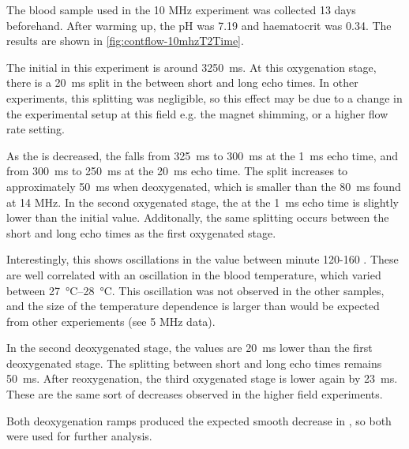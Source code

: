 The blood sample used in the 10 MHz experiment was collected 13 days beforehand.
After warming up, the pH was 7.19 and haematocrit was 0.34.
The results are shown in \autoref{fig:contflow-10mhzT2Time}.

The initial \Ttwo in this experiment is around \SI{3250}{ms}.
At this oxygenation stage, there is a \SI{20}{ms} split in the \Ttwo between short and long echo times.
In other experiments, this splitting was negligible, so this effect may be due to a change in the experimental setup at this field e.g. the magnet shimming, or a higher flow rate setting.

As the \SOtwo is decreased, the \Ttwo falls from \SI{325}{ms} to \SI{300}{ms} at the \SI{1}{ms} echo time, and from \SI{300}{ms} to \SI{250}{ms} at the \SI{20}{ms} echo time.
The split increases to approximately \SI{50}{ms} when deoxygenated, which is smaller than the \SI{80}{ms} found at 14 MHz.
In the second oxygenated stage, the \Ttwo at the \SI{1}{ms} echo time is slightly lower than the initial value.
Additonally, the same splitting occurs between the short and long echo times as the first oxygenated stage.

Interestingly, this shows oscillations in the \Ttwo value between minute 120-160 .
These are well correlated with an oscillation in the blood temperature, which varied between \SIrange{27}{28}{\celsius}.
This oscillation was not observed in the other samples, and the size of the temperature dependence is larger than would be expected from other experiements (see 5 MHz data).

In the second deoxygenated stage, the \Ttwo values are \SI{20}{ms} lower than the first deoxygenated stage.
The splitting between short and long echo times remains \SI{50}{ms}.
After reoxygenation, the third oxygenated stage is lower again by \SI{23}{ms}.
These are the same sort of decreases observed in the higher field experiments.

Both deoxygenation ramps produced the expected smooth decrease in \Ttwo, so both were used for further analysis.



